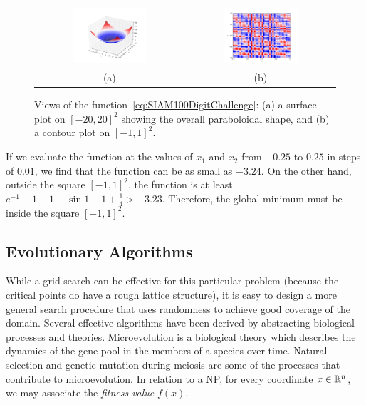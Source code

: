 \begin{figure}[htbp]
\begin{center}
\begin{tabular}{cc}
\hspace*{-0.5cm}\includegraphics[width=0.525\textwidth]{MathProgf1}&
\hspace*{-0.5cm}\includegraphics[width=0.525\textwidth]{MathProgf2}\\
(a) & (b)\\
\end{tabular}
\caption{Views of the function~\eqref{eq:SIAM100DigitChallenge}: (a) a surface plot on $[-20,20]^2$ showing the overall paraboloidal shape, and (b) a contour plot on $[-1,1]^2$.}
\label{figure:MathProgf}
\end{center}
\end{figure}

If we evaluate the function at the values of $x_1$ and $x_2$ from $-0.25$ to $0.25$ in steps of $0.01$, we find that the function can be as small as $-3.24$. On the other hand, outside the square $[-1,1]^2$, the function is at least $e^{-1}-1-1-\sin1-1+\frac{1}{4} > -3.23$. Therefore, the global minimum must be inside the square $[-1,1]^2$.

\subsection{Evolutionary Algorithms}

While a grid search can be effective for this particular problem (because the critical points do have a rough lattice structure), it is easy to design a more general search procedure that uses randomness to achieve good coverage of the domain. Several effective algorithms have been derived by abstracting biological processes and theories. Microevolution is a biological theory which describes the dynamics of the gene pool in the members of a species over time. Natural selection and genetic mutation during meiosis are some of the processes that contribute to microevolution. In relation to a NP, for every coordinate $x\in\mathbb{R}^n$, we may associate the {\em fitness value} $f(x)$.

